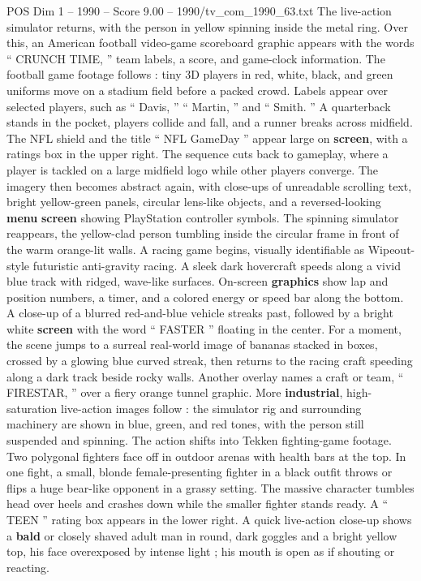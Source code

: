 \begin{textsample}{POS Dim 1 – 1990 – Score 9.00 – 1990/tv\_com\_1990\_63.txt}
The live-action simulator returns, with the person in yellow spinning inside the metal ring.
Over this, an American football video-game scoreboard graphic appears with the words “ CRUNCH TIME, ” team labels, a score, and game-clock information.
The football game footage follows : tiny 3D players in red, white, black, and green uniforms move on a stadium field before a packed crowd.
Labels appear over selected players, such as “ Davis, ” “ Martin, ” and “ Smith. ” A quarterback stands in the pocket, players collide and fall, and a runner breaks across midfield.
The NFL shield and the title “ NFL GameDay ” appear large on \textbf{screen}, with a ratings box in the upper right.
The sequence cuts back to gameplay, where a player is tackled on a large midfield logo while other players converge.
The imagery then becomes abstract again, with close-ups of unreadable scrolling text, bright yellow-green panels, circular lens-like objects, and a reversed-looking \textbf{menu} \textbf{screen} showing PlayStation controller symbols.
The spinning simulator reappears, the yellow-clad person tumbling inside the circular frame in front of the warm orange-lit walls.
A racing game begins, visually identifiable as Wipeout-style futuristic anti-gravity racing.
A sleek dark hovercraft speeds along a vivid blue track with ridged, wave-like surfaces.
On-screen \textbf{graphics} show lap and position numbers, a timer, and a colored energy or speed bar along the bottom.
A close-up of a blurred red-and-blue vehicle streaks past, followed by a bright white \textbf{screen} with the word “ FASTER ” floating in the center.
For a moment, the scene jumps to a surreal real-world image of bananas stacked in boxes, crossed by a glowing blue curved streak, then returns to the racing craft speeding along a dark track beside rocky walls.
Another overlay names a craft or team, “ FIRESTAR, ” over a fiery orange tunnel graphic.
More \textbf{industrial}, high-saturation live-action images follow : the simulator rig and surrounding machinery are shown in blue, green, and red tones, with the person still suspended and spinning.
The action shifts into Tekken fighting-game footage.
Two polygonal fighters face off in outdoor arenas with health bars at the top.
In one fight, a small, blonde female-presenting fighter in a black outfit throws or flips a huge bear-like opponent in a grassy setting.
The massive character tumbles head over heels and crashes down while the smaller fighter stands ready.
A “ TEEN ” rating box appears in the lower right.
A quick live-action close-up shows a \textbf{bald} or closely shaved adult man in round, dark goggles and a bright yellow top, his face overexposed by intense light ; his mouth is open as if shouting or reacting.

\end{textsample}
